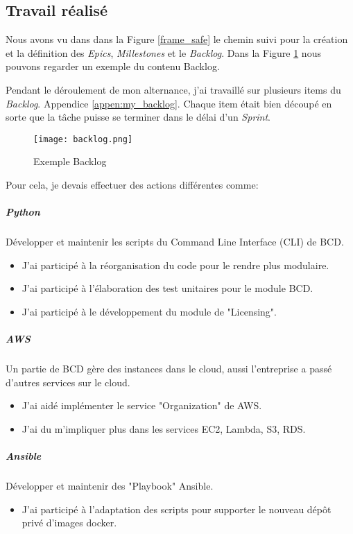 \subsection{Travail réalisé}\label{sec:work_done}
Nous avons vu dans dans la Figure \ref{frame_safe} le chemin suivi pour la création et la définition des \textit{Epics}, \textit{Millestones} et le \textit{Backlog}. Dans la Figure \ref{fig:backlog} nous pouvons regarder un exemple du contenu Backlog.

Pendant le déroulement de mon alternance, j'ai travaillé sur plusieurs items du \textit{Backlog}. Appendice  \ref{appen:my_backlog}. Chaque item était bien découpé en sorte que la tâche puisse se terminer dans le délai d'un \textit{Sprint}.

\begin{figure}[!ht]
\centering
\texttt{[image: backlog.png]}
\caption{Exemple Backlog}
\label{fig:backlog}
\end{figure}

Pour cela, je devais effectuer des actions différentes comme:

\subparagraph{Python} Développer et maintenir les scripts du Command Line Interface (CLI) de BCD.
\begin{itemize}
  \item J'ai participé à la réorganisation du code pour le rendre plus modulaire.
  \item J'ai participé à l'élaboration des test unitaires pour le module BCD.
  \item J'ai participé à le développement du module de "Licensing".
\end{itemize}

\subparagraph{AWS} Un partie de BCD gère des instances dans le cloud, aussi l'entreprise a passé d'autres services sur le cloud.
\begin{itemize}
  \item J'ai aidé implémenter le service "Organization" de AWS.
  \item J'ai du m'impliquer plus dans les services EC2, Lambda, S3, RDS.
\end{itemize}

\subparagraph{Ansible} Développer et maintenir des "Playbook" Ansible.
\begin{itemize}
  \item J'ai participé à l'adaptation des scripts pour supporter le nouveau dépôt privé d'images docker.
\end{itemize}

